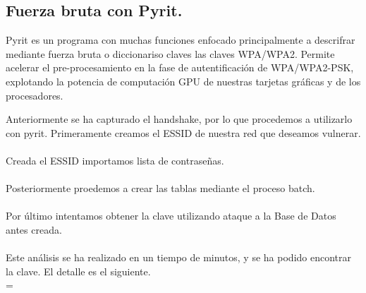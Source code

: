 \subsection{Fuerza bruta con Pyrit.}

Pyrit es un programa con muchas funciones enfocado principalmente a descrifrar mediante fuerza bruta o diccionariso claves las claves WPA/WPA2. Permite acelerar el pre-procesamiento en la fase de autentificación de WPA/WPA2-PSK, explotando la potencia de computación GPU de nuestras tarjetas gráficas y de los procesadores.

Anteriormente se ha capturado el handshake, por lo que procedemos a utilizarlo con pyrit. Primeramente creamos el ESSID de nuestra red que deseamos vulnerar.\\

\textbf{}\\

Creada el ESSID importamos lista de contraseñas.\\

\textbf{}\\

Posteriormente proedemos a crear las tablas mediante el proceso batch.\\

\textbf{}\\

Por último intentamos obtener la clave utilizando ataque a la Base de Datos antes creada.\\

\textbf{}\\


Este análisis se ha realizado en un tiempo de \textbf{} minutos, y \textbf{} se ha podido encontrar la clave. El detalle es el siguiente.\\

\begingroup
        \fontsize{7pt}{7pt}=\selectfont
        }
\endgroup

